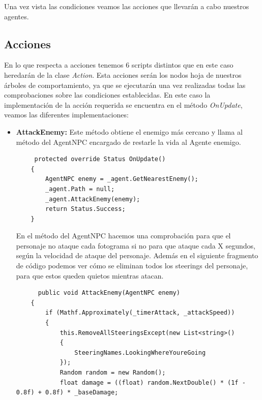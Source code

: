 \begin{itemize}
\end{itemize}

Una vez vista las condiciones veamos las acciones que llevarán a cabo nuestros agentes.

\subsection{Acciones}
En lo que respecta a acciones tenemos 6 scripts distintos que en este caso heredarán de la clase \textit{Action}. Esta acciones serán los nodos hoja de nuestros árboles de comportamiento, ya que se ejecutarán una vez realizadas todas las comprobaciones sobre las condiciones establecidas. En este caso la implementación de la acción requerida se encuentra en el método \textit{OnUpdate}, veamos las diferentes implementaciones:
\begin{itemize}
    \item  \textbf{AttackEnemy: } Este método obtiene el enemigo más cercano y llama al método del AgentNPC encargado de restarle la vida al Agente enemigo.
    \begin{lstlisting}
     protected override Status OnUpdate()
    {
        AgentNPC enemy = _agent.GetNearestEnemy();
        _agent.Path = null;
        _agent.AttackEnemy(enemy);
        return Status.Success;
    }
    \end{lstlisting}
    En el método del AgentNPC hacemos una comprobación para que el personaje no ataque cada fotograma si no para que ataque cada X segundos, según la velocidad de ataque del personaje. Además en el siguiente fragmento de código podemos ver cómo se eliminan todos los steerings del personaje, para que estos queden quietos mientras atacan.
    \begin{lstlisting}
      public void AttackEnemy(AgentNPC enemy)
    {
        if (Mathf.Approximately(_timerAttack, _attackSpeed))
        {
            this.RemoveAllSteeringsExcept(new List<string>()
            {
                SteeringNames.LookingWhereYoureGoing
            });
            Random random = new Random();
            float damage = ((float) random.NextDouble() * (1f - 0.8f) + 0.8f) * _baseDamage;
        

\end{lstlisting}
\end{itemize}
